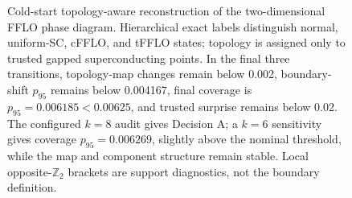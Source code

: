 \begin{figure}[t]
  \centering
  \caption{Cold-start topology-aware reconstruction of the two-dimensional
  FFLO phase diagram. Hierarchical exact labels distinguish normal,
  uniform-SC, cFFLO, and tFFLO states; topology is assigned only to trusted
  gapped superconducting points. In the final three transitions, topology-map
  changes remain below 0.002, boundary-shift $p_{95}$ remains below 0.004167,
  final coverage is $p_{95}=0.006185<0.00625$, and trusted surprise remains
  below 0.02. The configured $k=8$ audit gives Decision A; a $k=6$ sensitivity
  gives coverage $p_{95}=0.006269$, slightly above the nominal threshold,
  while the map and component structure remain stable. Local opposite-$\mathbb{Z}_2$
  brackets are support diagnostics, not the boundary definition.}
  \label{fig:stageiii-topology}
\end{figure}
